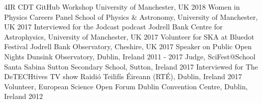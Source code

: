 \begin{cvpress}
   \cvpres
   {4IR CDT GitHub Workshop}
    {University of Manchester, UK}
    {2018}
   \cvpres
   	{Women in Physics Careers Panel}
    {School of Physics \& Astronomy, University of Manchester, UK}
    {2017}
   \cvpres
   {Interviewed for the Jodcast podcast}
    {Jodrell Bank Centre for Astrophysics, University of Manchester, UK}
    {2017}
   \cvpres
   {Volunteer for SKA at Bluedot Festival}
    {Jodrell Bank Observatory, Cheshire, UK}
    {2017}
   \cvpres
   {Speaker on Public Open Nights}
    {Dunsink Observatory, Dublin, Ireland}
    {2011 - 2017}
   \cvpres
   	{Judge, SciFest@School}
    {Santa Sabina Sutton Secondary School, Sutton, Ireland}
    {2017}
   \cvpres
   	{Interviewed for The DeTECHtives TV show}
    {Raidi{\'o} Teilif{\'i}s {\'E}ireann (RT{\'E}), Dublin, Ireland}
    {2017}
   \cvpres
   	{Volunteer, European Science Open Forum}
    {Dublin Convention Centre, Dublin, Ireland}
    {2012}
\end{cvpress}


